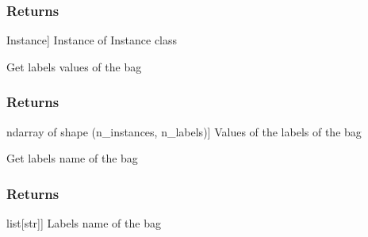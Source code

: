 \documentclass[letterpaper,10pt,english]{sphinxmanual}
\begin{document}
\begin{fulllineitems}
\begin{fulllineitems}
\begin{description}
\end{description}


\subsubsection{Returns}
\label{\detokenize{data/_autosummary/miml.data.bag.Bag:id10}}\begin{description}
\sphinxlineitem{instance}{[}Instance{]}
\sphinxAtStartPar
Instance of Instance class

\end{description}

\end{fulllineitems}


\begin{fulllineitems}
\label{\detokenize{data/_autosummary/miml.data.bag.Bag:miml.data.bag.Bag.get_labels}}
\pysigstartsignatures
{}
\pysigstopsignatures
\sphinxAtStartPar
Get labels values of the bag


\subsubsection{Returns}
\label{\detokenize{data/_autosummary/miml.data.bag.Bag:id11}}\begin{description}
\sphinxlineitem{labels data}{[}ndarray of shape (n\_instances, n\_labels){]}
\sphinxAtStartPar
Values of the labels of the bag

\end{description}

\end{fulllineitems}


\begin{fulllineitems}
\label{\detokenize{data/_autosummary/miml.data.bag.Bag:miml.data.bag.Bag.get_labels_name}}
\pysigstartsignatures
{}
\pysigstopsignatures
\sphinxAtStartPar
Get labels name of the bag


\subsubsection{Returns}
\label{\detokenize{data/_autosummary/miml.data.bag.Bag:id12}}\begin{description}
\sphinxlineitem{labels}{[}list{[}str{]}{]}
\sphinxAtStartPar
Labels name of the bag


\end{description}
\end{fulllineitems}
\end{fulllineitems}
\end{document}
